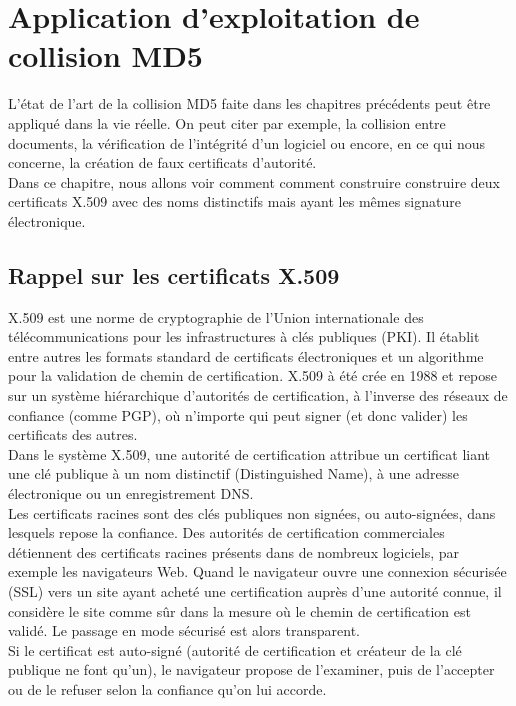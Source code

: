 \documentclass[a4paper,11pt,french]{article}
\begin{document}
\section{Application d'exploitation de collision MD5}

L'état de l'art de la collision MD5 faite dans les chapitres précédents peut être appliqué dans la vie réelle. On peut citer par exemple, la collision entre documents, la vérification de l'intégrité d'un logiciel ou encore, en ce qui nous concerne, la création de faux certificats d'autorité. \\

Dans ce chapitre, nous allons voir comment comment construire construire deux certificats X.509 avec des noms distinctifs mais ayant les mêmes signature électronique.

\subsection{Rappel sur les certificats X.509}

X.509 est une norme de cryptographie de l'Union internationale des télécommunications pour les infrastructures à clés publiques (PKI). Il établit entre autres les formats standard de certificats électroniques et un algorithme pour la validation de chemin de certification. X.509 à été crée en 1988  et repose sur un système hiérarchique d'autorités de certification, à l'inverse des réseaux de confiance (comme PGP), où n'importe qui peut signer (et donc valider) les certificats des autres.\\

Dans le système X.509, une autorité de certification attribue un certificat liant une clé publique à un nom distinctif (Distinguished Name), à une adresse électronique ou un enregistrement DNS.\\

Les certificats racines sont des clés publiques non signées, ou auto-signées, dans lesquels repose la confiance. Des autorités de certification commerciales détiennent des certificats racines présents dans de nombreux logiciels, par exemple les navigateurs Web. Quand le navigateur ouvre une connexion sécurisée (SSL) vers un site ayant acheté une certification auprès d'une autorité connue, il considère le site comme sûr dans la mesure où le chemin de certification est validé. Le passage en mode sécurisé est alors transparent.\\

Si le certificat est auto-signé (autorité de certification et créateur de la clé publique ne font qu'un), le navigateur propose de l'examiner, puis de l'accepter ou de le refuser selon la confiance qu'on lui accorde.\\
\end{document}

